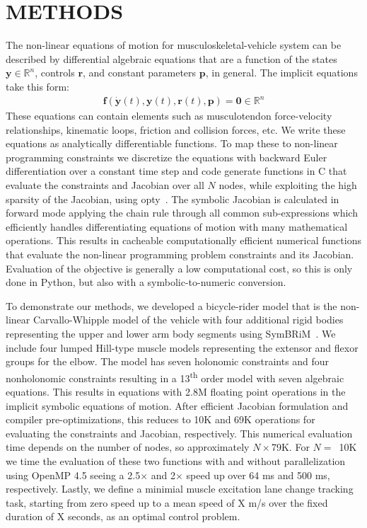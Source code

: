 \documentclass[11pt,twocolumn]{article}
\begin{document}
\section*{METHODS}
\vspace{-1em}
%
The non-linear equations of motion for musculoskeletal-vehicle system can be
described by differential algebraic equations that are a function of the states
\(\mathbf{y} \in \mathbb{R}^n\), controls \(\mathbf{r}\), and constant
parameters \(\mathbf{p}\), in general. The implicit equations take this form:
%
\begin{align}
  \mathbf{f}(\dot{\mathbf{y}}(t), \mathbf{y}(t), \mathbf{r}(t), \mathbf{p}) =
  \mathbf{0} \in \mathbb{R}^n
\end{align}
%
These equations can contain elements such as musculotendon force-velocity
relationships, kinematic loops, friction and collision forces, etc. We write
these equations as analytically differentiable functions. To map these to
non-linear programming constraints we discretize the equations with backward
Euler differentiation over a constant time step and code generate functions in
C that evaluate the constraints and Jacobian over all \(N\) nodes, while
exploiting the high sparsity of the Jacobian, using opty~\cite{Moore2018}. The
symbolic Jacobian is calculated in forward mode applying the chain rule through
all common sub-expressions which efficiently handles differentiating equations
of motion with many mathematical operations. This results in cacheable
computationally efficient numerical functions that evaluate the non-linear
programming problem constraints and its Jacobian. Evaluation of the objective
is generally a low computational cost, so this is only done in Python, but also
with a symbolic-to-numeric conversion.

To demonstrate our methods, we developed a bicycle-rider model that is the
non-linear Carvallo-Whipple model of the vehicle with four additional rigid
bodies representing the upper and lower arm body segments using
SymBRiM~\cite{Stienstra2023a}. We include four lumped Hill-type muscle models
representing the extensor and flexor groups for the elbow. The model has seven
holonomic constraints and four nonholonomic constraints resulting in a
13\textsuperscript{th} order model with seven algebraic equations. This results
in equations with 2.8M floating point operations in the implicit symbolic
equations of motion. After efficient Jacobian formulation and compiler
pre-optimizations, this reduces to 10K and 69K operations for evaluating the
constraints and Jacobian, respectively. This numerical evaluation time depends
on the number of nodes, so approximately \(N\times\)79K. For \(N=\)~10K we time
the evaluation of these two functions with and without parallelization using
OpenMP 4.5 seeing a 2.5\(\times\) and 2\(\times\) speed up over 64 ms and 500
ms, respectively. Lastly, we define a minimial muscle excitation lane change
tracking task, starting from zero speed up to a mean speed of X m/s over the
fixed duration of X seconds, as an optimal control problem.
\end{document}
